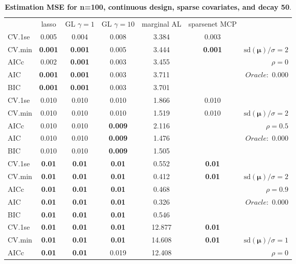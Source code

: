 \clearpage
\begin{table}\vspace{-.5cm}
\caption[l]{ { \bf Estimation MSE for n=100, continuous design, 
sparse covariates, and  decay  50}.}
\vspace{-.5cm}
\footnotesize{}
\begin{center}
\begin{tabular}{l*{5}{c}|r}
& lasso & GL $\gamma=1$ & GL $\gamma=10$ & marginal AL & sparsenet MCP  & \\
 \cline{1-7}
CV.1se & 0.005 & 0.004 & 0.008 & 3.384 & 0.003 & \\
CV.min & {\bf 0.001} & {\bf 0.001} & 0.005 & 3.444 & {\bf 0.001} &  $\mathrm{sd}(\mathbf{\mu})/\sigma=2$ \\
AICc & 0.002 & {\bf 0.001} & 0.003 & 3.455 & & $\rho=0$ \\
AIC & {\bf 0.001} & {\bf 0.001} & 0.003 & 3.711 & &  \multirow{2}{*}{$Oracle: $ 0.000} \\
BIC & {\bf 0.001} & {\bf 0.001} & 0.003 & 3.701 & &  \\
 \hline 
CV.1se & 0.010 & 0.010 & 0.010 & 1.866 & 0.010 & \\
CV.min & 0.010 & 0.010 & 0.010 & 1.519 & 0.010 &  $\mathrm{sd}(\mathbf{\mu})/\sigma=2$ \\
AICc & 0.010 & 0.010 & {\bf 0.009} & 2.116 & & $\rho=0.5$ \\
AIC & 0.010 & 0.010 & {\bf 0.009} & 1.476 & &  \multirow{2}{*}{$Oracle: $ 0.000} \\
BIC & 0.010 & 0.010 & {\bf 0.009} & 1.505 & &  \\
 \hline 
CV.1se & {\bf 0.01} & {\bf 0.01} & {\bf 0.01} & 0.552 & {\bf 0.01} & \\
CV.min & {\bf 0.01} & {\bf 0.01} & {\bf 0.01} & 0.412 & {\bf 0.01} &  $\mathrm{sd}(\mathbf{\mu})/\sigma=2$ \\
AICc & {\bf 0.01} & {\bf 0.01} & {\bf 0.01} & 0.468 & & $\rho=0.9$ \\
AIC & {\bf 0.01} & {\bf 0.01} & {\bf 0.01} & 0.326 & &  \multirow{2}{*}{$Oracle: $ 0.000} \\
BIC & {\bf 0.01} & {\bf 0.01} & {\bf 0.01} & 0.546 & &  \\
 \hline 
CV.1se & {\bf 0.01} & {\bf 0.01} & {\bf 0.01} & 12.877 & {\bf 0.01} & \\
CV.min & {\bf 0.01} & {\bf 0.01} & {\bf 0.01} & 14.608 & {\bf 0.01} &  $\mathrm{sd}(\mathbf{\mu})/\sigma=1$ \\
AICc & {\bf 0.01} & {\bf 0.01} & 0.019 & 12.408 & & $\rho=0$ \\

\end{tabular}
\end{center}
\end{table}
